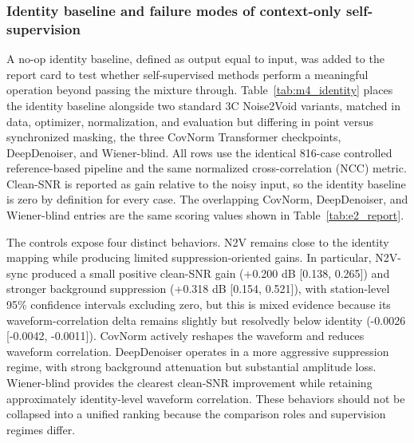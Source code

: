 \documentclass[review,12pt,authoryear]{elsarticle}
\begin{document}
\subsubsection{Identity baseline and failure modes of context-only self-supervision}
\label{sec:m4_identity}
A no-op identity baseline, defined as output equal to input, was added to the report card to test whether self-supervised methods perform a meaningful operation beyond passing the mixture through. Table~\ref{tab:m4_identity} places the identity baseline alongside two standard 3C Noise2Void variants, matched in data, optimizer, normalization, and evaluation but differing in point versus synchronized masking, the three CovNorm Transformer checkpoints, DeepDenoiser, and Wiener-blind. All rows use the identical 816-case controlled reference-based pipeline and the same normalized cross-correlation (NCC) metric. Clean-SNR is reported as gain relative to the noisy input, so the identity baseline is zero by definition for every case. The overlapping CovNorm, DeepDenoiser, and Wiener-blind entries are the same scoring values shown in Table~\ref{tab:e2_report}.

\begin{table}[!htbp]
\centering
\caption{No-taper identity baseline and matched method comparisons. DeepDenoiser is a supervised external reference; Wiener-blind uses the submitted default blind signal-processing configuration.}
\label{tab:m4_identity}
\small
\resizebox{\linewidth}{!}{}
\end{table}

The controls expose four distinct behaviors. N2V remains close to the identity mapping while producing limited suppression-oriented gains. In particular, N2V-sync produced a small positive clean-SNR gain (+0.200 dB [0.138, 0.265]) and stronger background suppression (+0.318 dB [0.154, 0.521]), with station-level 95\% confidence intervals excluding zero, but this is mixed evidence because its waveform-correlation delta remains slightly but resolvedly below identity (-0.0026 [-0.0042, -0.0011]). CovNorm actively reshapes the waveform and reduces waveform correlation. DeepDenoiser operates in a more aggressive suppression regime, with strong background attenuation but substantial amplitude loss. Wiener-blind provides the clearest clean-SNR improvement while retaining approximately identity-level waveform correlation. These behaviors should not be collapsed into a unified ranking because the comparison roles and supervision regimes differ.
\end{document}
